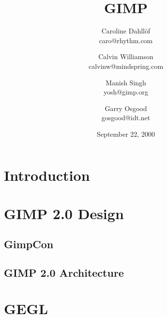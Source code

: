 \documentclass{report}
\begin{document}
\begin{titlepage}
\title{\huge GIMP}
\author{Caroline Dahll\"{o}f\\
caro@rhythm.com 
\and Calvin Williamson\\
calvinw@mindspring.com
\and Manish Singh\\
yosh@gimp.org
\and Garry Osgood\\
gosgood@idt.net}
\date{September 22, 2000}
\maketitle
\end{titlepage}
\tableofcontents


% 
%




\chapter{Introduction}
\label{ch:Introduction}



\chapter{GIMP 2.0 Design}
\label{ch:GIMP_2.0_Design}


\section{GimpCon}
\label{sec:GimpCon}


\section{GIMP 2.0 Architecture}
\label{sec:GIMP_2.0_Architecture}




\chapter{GEGL}
\label{ch:GEGL}

\end{document}
